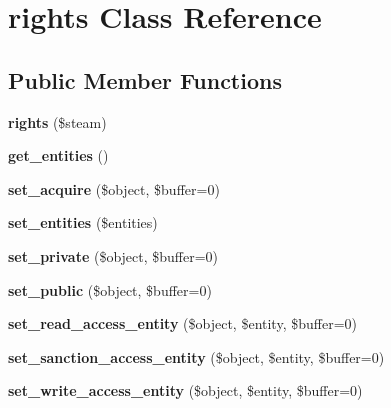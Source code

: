 \hypertarget{classrights}{
\section{rights Class Reference}
\label{classrights}
}
\subsection*{Public Member Functions}
\begin{DoxyCompactItemize}
\item 
\hypertarget{classrights_a9089b3933ffa44b530a542d90ffefb0f}{
{\bfseries rights} (\$steam)}
\label{classrights_a9089b3933ffa44b530a542d90ffefb0f}

\item 
\hypertarget{classrights_a76d7f75aef2450bfdab42dd93aea9743}{
{\bfseries get\_\-entities} ()}
\label{classrights_a76d7f75aef2450bfdab42dd93aea9743}

\item 
\hypertarget{classrights_ae3394a2178345fb29005306d449fcdd5}{
{\bfseries set\_\-acquire} (\$object, \$buffer=0)}
\label{classrights_ae3394a2178345fb29005306d449fcdd5}

\item 
\hypertarget{classrights_a0896c1859a35622c3839a6c17f3dc809}{
{\bfseries set\_\-entities} (\$entities)}
\label{classrights_a0896c1859a35622c3839a6c17f3dc809}

\item 
\hypertarget{classrights_a676534a338e1320c648eac3ce0d25bd1}{
{\bfseries set\_\-private} (\$object, \$buffer=0)}
\label{classrights_a676534a338e1320c648eac3ce0d25bd1}

\item 
\hypertarget{classrights_a8547f8c20a124dbc6aace52fcae256da}{
{\bfseries set\_\-public} (\$object, \$buffer=0)}
\label{classrights_a8547f8c20a124dbc6aace52fcae256da}

\item 
\hypertarget{classrights_ad3100921eb6415706e8b006244872111}{
{\bfseries set\_\-read\_\-access\_\-entity} (\$object, \$entity, \$buffer=0)}
\label{classrights_ad3100921eb6415706e8b006244872111}

\item 
\hypertarget{classrights_af9a997954be0602f8ed0fdac6f75a6c1}{
{\bfseries set\_\-sanction\_\-access\_\-entity} (\$object, \$entity, \$buffer=0)}
\label{classrights_af9a997954be0602f8ed0fdac6f75a6c1}

\item 
\hypertarget{classrights_ac1b000b8ead9fe4dbca20bb29722e765}{
{\bfseries set\_\-write\_\-access\_\-entity} (\$object, \$entity, \$buffer=0)}
\label{classrights_ac1b000b8ead9fe4dbca20bb29722e765}


\end{DoxyCompactItemize}
